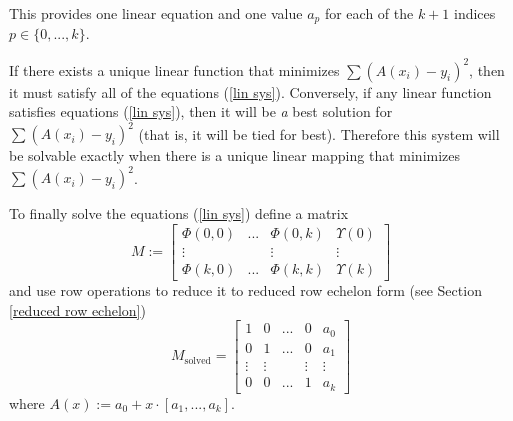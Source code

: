 This provides one linear equation and one value $a_p$ for each of the $k+1$ indices $p\in\{0,...,k\}$.

If there exists a unique linear function that minimizes $\sum(A(x_i) - y_i)^2$, then it must satisfy all of the equations (\ref{lin sys}). Conversely, if any linear function satisfies equations (\ref{lin sys}), then it will be \emph{a} best solution for $\sum(A(x_i) - y_i)^2$ (that is, it will be tied for best). Therefore this system will be solvable exactly when there is a unique linear mapping that minimizes $\sum(A(x_i) - y_i)^2$.

To finally solve the equations (\ref{lin sys}) define a matrix
$$M:=\begin{bmatrix}
\Phi(0,0)&...&\Phi(0,k)&\Upsilon(0)\\
\vdots&&\vdots&\vdots\\
\Phi(k,0)&...&\Phi(k,k)&\Upsilon(k)
\end{bmatrix}$$
and use row operations to reduce it to reduced row echelon form (see Section \ref{reduced row echelon})
$$M_{\text{solved}}=\begin{bmatrix}
1&0&...&0&a_0\\
0&1&...&0&a_1\\
\vdots&\vdots&&\vdots&\vdots\\
0&0&...&1&a_k
\end{bmatrix}$$
where $A(x):=a_0+x\cdot[a_1,...,a_k]$.
